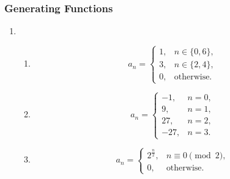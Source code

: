 \documentclass{sig-alternate-05-2015}
\begin{document}
\subsubsection{Generating Functions}
\begin{enumerate}
	\item \begin{enumerate}
		\item \begin{equation}
			a_n = \begin{cases}
				1,&n \in \{0, 6\},\\
				3,&n \in \{2, 4\},\\
				0,&\text{otherwise.}
			\end{cases}
		\end{equation}
		
		\item \begin{equation}
			a_n = \begin{cases}
				-1,&n = 0,\\
				9,&n = 1,\\
				27,&n = 2,\\
				-27,&n = 3.
			\end{cases}
		\end{equation}
		
		\item \begin{equation}
			a_n = \begin{cases}
				2^{\frac{n}{2}}, & n \equiv 0 \pmod{2},\\
				0, & \text{otherwise}.
			\end{cases}
		\end{equation}
		

\end{enumerate}
\end{enumerate}
\end{document}
